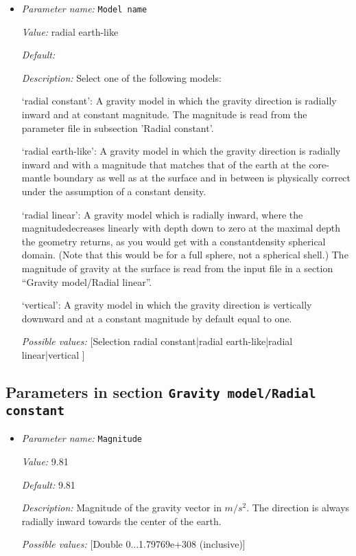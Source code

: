 \begin{itemize}
\item {\it Parameter name:} {\tt Model name}


{\it Value:} radial earth-like


{\it Default:} 


{\it Description:} Select one of the following models:

`radial constant': A gravity model in which the gravity direction is radially inward and at constant magnitude. The magnitude is read from the parameter file in subsection 'Radial constant'.

`radial earth-like': A gravity model in which the gravity direction is radially inward and with a magnitude that matches that of the earth at the core-mantle boundary as well as at the surface and in between is physically correct under the assumption of a constant density.

`radial linear': A gravity model which is radially inward, where the magnitudedecreases linearly with depth down to zero at the maximal depth the geometry returns, as you would get with a constantdensity spherical domain. (Note that this would be for a full sphere, not a spherical shell.) The magnitude of gravity at the surface is read from the input file in a section ``Gravity model/Radial linear''.

`vertical': A gravity model in which the gravity direction is vertically downward and at a constant magnitude by default equal to one.


{\it Possible values:} [Selection radial constant|radial earth-like|radial linear|vertical ]
\end{itemize}



\subsection{Parameters in section \tt Gravity model/Radial constant}
\label{parameters:Gravity_20model/Radial_20constant}

\begin{itemize}
\item {\it Parameter name:} {\tt Magnitude}


{\it Value:} 9.81


{\it Default:} 9.81


{\it Description:} Magnitude of the gravity vector in $m/s^2$. The direction is always radially inward towards the center of the earth.


{\it Possible values:} [Double 0...1.79769e+308 (inclusive)]
\end{itemize}

